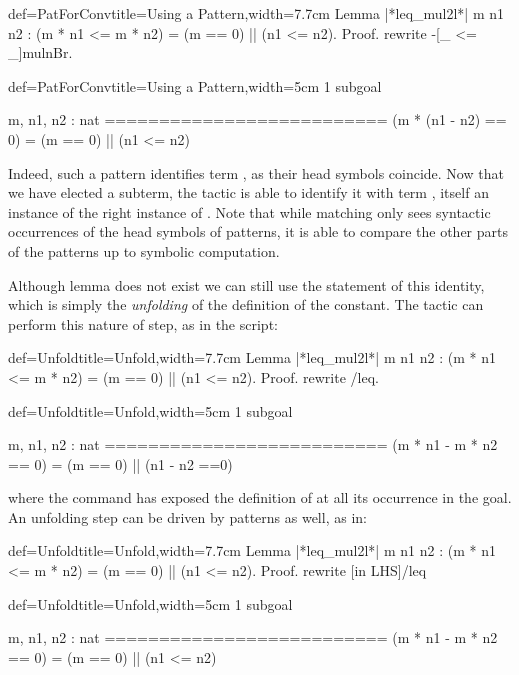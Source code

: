 \begin{coq}{def=PatForConv}{title=Using a Pattern,width=7.7cm}
Lemma |*leq_mul2l*| m n1 n2 :
(m * n1 <= m * n2) = (m == 0) || (n1 <= n2).
Proof.
rewrite -[_ <= _]mulnBr.
\end{coq}
\begin{coqout}{def=PatForConv}{title=Using a Pattern,width=5cm}
1 subgoal

m, n1, n2 : nat
==========================
(m * (n1 - n2) == 0) =
(m == 0) || (n1 <= n2)
\end{coqout}

Indeed, such a pattern identifies term , as
their head symbols coincide. Now that we have elected a subterm, the
 tactic is able to identify it with term
, itself an instance of the right instance
of . Note that while matching only sees syntactic
occurrences of the
head symbols of patterns, it is able to compare the other parts of the
patterns up to symbolic computation.

Although lemma  does not exist we can still use the
statement of this identity, which is simply the \emph{unfolding} of
the definition of the  constant. The  tactic can
perform this nature of step, as in the script:

\begin{coq}{def=Unfold}{title=Unfold,width=7.7cm}
Lemma |*leq_mul2l*| m n1 n2 :
(m * n1 <= m * n2) = (m == 0) || (n1 <= n2).
Proof.
rewrite /leq.
\end{coq}
\begin{coqout}{def=Unfold}{title=Unfold,width=5cm}
1 subgoal

m, n1, n2 : nat
==========================
(m * n1 - m * n2 == 0) =
(m == 0) || (n1 - n2 ==0)
\end{coqout}

where the command  has exposed the definition of
 at all its occurrence in the goal. An unfolding step can be
driven by patterns as well, as in:

\begin{coq}{def=Unfold}{title=Unfold,width=7.7cm}
Lemma |*leq_mul2l*| m n1 n2 :
(m * n1 <= m * n2) = (m == 0) || (n1 <= n2).
Proof.
rewrite [in LHS]/leq
\end{coq}
\begin{coqout}{def=Unfold}{title=Unfold,width=5cm}
1 subgoal

m, n1, n2 : nat
==========================
(m * n1 - m * n2 == 0) =
(m == 0) || (n1 <= n2)
\end{coqout}

